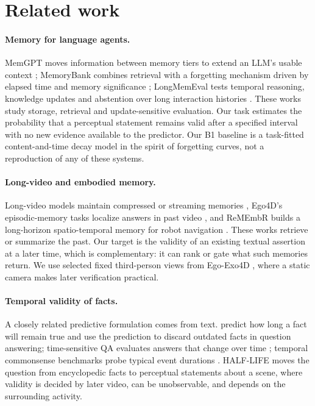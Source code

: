 \documentclass[10pt]{article}
\begin{document}
\section{Related work}
\label{sec:related}

\paragraph{Memory for language agents.} MemGPT moves information between memory tiers to extend an LLM's usable context \citep{packer2023memgpt}; MemoryBank combines retrieval with a forgetting mechanism driven by elapsed time and memory significance \citep{zhong2024memorybank}; LongMemEval tests temporal reasoning, knowledge updates and abstention over long interaction histories \citep{wu2025longmemeval}. These works study storage, retrieval and update-sensitive evaluation. Our task estimates the probability that a perceptual statement remains valid after a specified interval with no new evidence available to the predictor. Our B1 baseline is a task-fitted content-and-time decay model in the spirit of forgetting curves, not a reproduction of any of these systems.

\paragraph{Long-video and embodied memory.} Long-video models maintain compressed or streaming memories \citep{song2024moviechat,he2024malmm,chen2024videollmonline}, Ego4D's episodic-memory tasks localize answers in past video \citep{grauman2022ego4d}, and ReMEmbR builds a long-horizon spatio-temporal memory for robot navigation \citep{anwar2024remembr}. These works retrieve or summarize the past. Our target is the validity of an existing textual assertion at a later time, which is complementary: it can rank or gate what such memories return. We use selected fixed third-person views from Ego-Exo4D \citep{grauman2024egoexo4d}, where a static camera makes later verification practical.

\paragraph{Temporal validity of facts.} A closely related predictive formulation comes from text. \citet{zhang2023mitigating} predict how long a fact will remain true and use the prediction to discard outdated facts in question answering; time-sensitive QA evaluates answers that change over time \citep{chen2021timesensitive}; temporal commonsense benchmarks probe typical event durations \citep{zhou2019going}. HALF-LIFE moves the question from encyclopedic facts to perceptual statements about a scene, where validity is decided by later video, can be unobservable, and depends on the surrounding activity.
\end{document}
